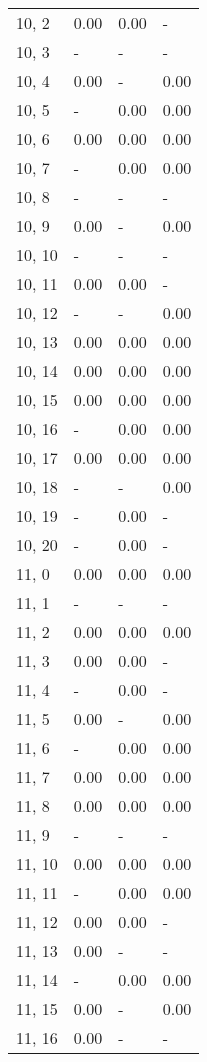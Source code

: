 \begin{table}
\begin{tabular}{llll}
10, 2  &  0.00 &  0.00 &     - \\
10, 3  &     - &     - &     - \\
10, 4  &  0.00 &     - &  0.00 \\
10, 5  &     - &  0.00 &  0.00 \\
10, 6  &  0.00 &  0.00 &  0.00 \\
10, 7  &     - &  0.00 &  0.00 \\
10, 8  &     - &     - &     - \\
10, 9  &  0.00 &     - &  0.00 \\
10, 10 &     - &     - &     - \\
10, 11 &  0.00 &  0.00 &     - \\
10, 12 &     - &     - &  0.00 \\
10, 13 &  0.00 &  0.00 &  0.00 \\
10, 14 &  0.00 &  0.00 &  0.00 \\
10, 15 &  0.00 &  0.00 &  0.00 \\
10, 16 &     - &  0.00 &  0.00 \\
10, 17 &  0.00 &  0.00 &  0.00 \\
10, 18 &     - &     - &  0.00 \\
10, 19 &     - &  0.00 &     - \\
10, 20 &     - &  0.00 &     - \\
11, 0  &  0.00 &  0.00 &  0.00 \\
11, 1  &     - &     - &     - \\
11, 2  &  0.00 &  0.00 &  0.00 \\
11, 3  &  0.00 &  0.00 &     - \\
11, 4  &     - &  0.00 &     - \\
11, 5  &  0.00 &     - &  0.00 \\
11, 6  &     - &  0.00 &  0.00 \\
11, 7  &  0.00 &  0.00 &  0.00 \\
11, 8  &  0.00 &  0.00 &  0.00 \\
11, 9  &     - &     - &     - \\
11, 10 &  0.00 &  0.00 &  0.00 \\
11, 11 &     - &  0.00 &  0.00 \\
11, 12 &  0.00 &  0.00 &     - \\
11, 13 &  0.00 &     - &     - \\
11, 14 &     - &  0.00 &  0.00 \\
11, 15 &  0.00 &     - &  0.00 \\
11, 16 &  0.00 &     - &     - \\

\end{tabular}
\end{table}
